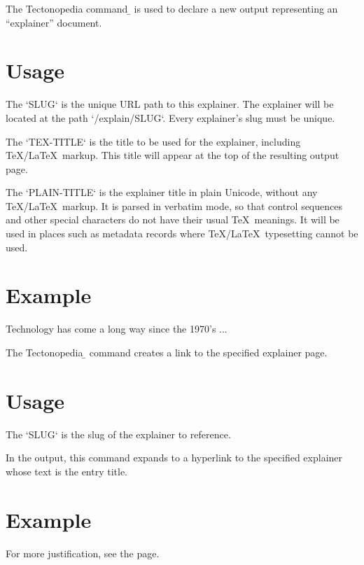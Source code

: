 
The Tectonopedia command \b{\string\Explainer} is used to declare a new output
representing an “explainer” document.

\section*{Usage}

\begin{texdisp}
\end{texdisp}

The \tex`SLUG` is the unique URL path to this explainer. The explainer will be
located at the path \tex`/explain/{SLUG}`. Every explainer's slug must be unique.

The \tex`TEX-TITLE` is the title to be used for the explainer, including
\TeX/\LaTeX\ markup. This title will appear at the top of the resulting output
page.

The \tex`PLAIN-TITLE` is the explainer title in plain Unicode, without any
\TeX/\LaTeX\ markup. It is parsed in verbatim mode, so that control sequences
and other special characters do not have their usual \TeX\ meanings. It will be
used in places such as metadata records where \TeX/\LaTeX\ typesetting cannot be
used.

\section*{Example}

\begin{texdisp}

Technology has come a long way since the 1970's ...
\end{texdisp}



The Tectonopedia \b{\string\explain} command creates a link to the specified
explainer page.

\section*{Usage}

\begin{texdisp}
\end{texdisp}

The \tex`SLUG` is the slug of the explainer to reference.

In the output, this command expands to a hyperlink to the specified explainer whose
text is the entry title.

\section*{Example}

\begin{texdisp}
For more justification, see the  page.
\end{texdisp}
